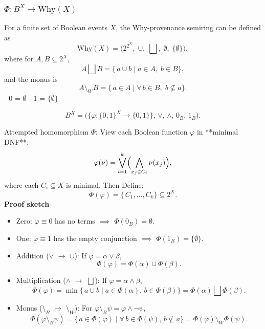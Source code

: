 \subsubsection{\(\Phi : B^X \to \mathrm{Why}(X)\)}

For a finite set of Boolean events \(X\), the Why-provenance semiring can be defined as
\[
\mathrm{Why}(X) = \bigl(2^{2^X},\;\cup,\;\bigsqcup,\;\emptyset,\;\{\emptyset\}\bigr),
\]
where for \(A,B\subseteq 2^X\),
\[
A \bigsqcup B = \{\,a \cup b \mid a\in A,\;b\in B\},
\]
and the monus is
\[
A \setminus_W B = \{\,a\in A\mid \forall\,b\in B,\;b\nsubseteq a\}.
\]
- 0 = \(\emptyset\)  
- 1 = \(\{\emptyset\}\)




 
\[
B^X = \bigl(\{\varphi:\{0,1\}^X\to\{0,1\}\},\,\vee,\,\wedge,\,0_B,\,1_B\bigr).
\]

Attempted homomorphism \(\Phi\):
View each Boolean function \(\varphi\) in **minimal DNF**:
   \[
   \varphi(\nu)
   = \bigvee_{i=1}^k \Bigl(\bigwedge_{x_j\in C_i} \nu(x_j)\Bigr),
   \]
   where each \(C_i\subseteq X\) is minimal.\newline
Then Define:
   \[
   \Phi(\varphi) = \{\,C_1,\dots,C_k\}\subseteq 2^X.
   \]
\textbf{Proof sketch}
\begin{itemize}
\item Zero:  
   \(\varphi\equiv 0\) has no terms $\implies$ \(\Phi(0_B)=\emptyset\).

\item One:  
   \(\varphi\equiv 1\) has the empty conjunction $\implies$ \(\Phi(1_B)=\{\emptyset\}\).

\item Addition (\(\vee\) $\rightarrow$ \(\cup\)):  
   If \(\varphi=\alpha\vee\beta\),
   \[
   \Phi(\varphi) = \Phi(\alpha)\cup\Phi(\beta).
   \]

\item Multiplication (\(\wedge\) $\rightarrow$  \(\bigsqcup\)):  
   If \(\varphi=\alpha\wedge\beta\),
   \[
   \Phi(\varphi)
   = \min\{\,a\cup b\mid a\in\Phi(\alpha),\,b\in\Phi(\beta)\}
   = \Phi(\alpha)\bigsqcup\Phi(\beta).
   \]

\item Monus (\(\setminus_B\) $\rightarrow$  \(\setminus_W\)):  
   For \(\varphi\setminus_B\psi = \varphi\wedge\neg\psi\),
   \[
   \Phi(\varphi\setminus_B\psi)
   = \{\,a\in\Phi(\varphi)\mid \forall\,b\in\Phi(\psi),\,b\nsubseteq a\}
   = \Phi(\varphi)\setminus_W\Phi(\psi).
   \]

\end{itemize}


